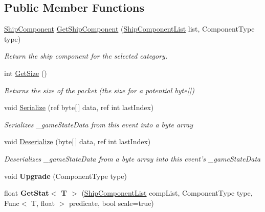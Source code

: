 \subsection*{Public Member Functions}
\begin{DoxyCompactItemize}
\item 
\hyperlink{class_skyrates_1_1_ship_1_1_ship_component}{Ship\-Component} \hyperlink{class_skyrates_1_1_ship_1_1_ship_data_a3ae55a2215158477e44bd7cb2a103e00}{Get\-Ship\-Component} (\hyperlink{class_skyrates_1_1_ship_1_1_ship_component_list}{Ship\-Component\-List} list, Component\-Type type)
\begin{DoxyCompactList}\small\item\em Return the ship component for the selected category. \end{DoxyCompactList}\item 
int \hyperlink{class_skyrates_1_1_ship_1_1_ship_data_ab97c57ac7d3485ed73997201194fed67}{Get\-Size} ()
\begin{DoxyCompactList}\small\item\em Returns the size of the packet (the size for a potential byte\mbox{[}\mbox{]}) \end{DoxyCompactList}\item 
void \hyperlink{class_skyrates_1_1_ship_1_1_ship_data_aecbf0716f2aa099de5398ad12a284560}{Serialize} (ref byte\mbox{[}$\,$\mbox{]} data, ref int last\-Index)
\begin{DoxyCompactList}\small\item\em Serializes \-\_\-game\-State\-Data from this event into a byte array \end{DoxyCompactList}\item 
void \hyperlink{class_skyrates_1_1_ship_1_1_ship_data_a5cdd978d0ede1a2d54c963e43ffd0eab}{Deserialize} (byte\mbox{[}$\,$\mbox{]} data, ref int last\-Index)
\begin{DoxyCompactList}\small\item\em Deserializes \-\_\-game\-State\-Data from a byte array into this event's \-\_\-game\-State\-Data \end{DoxyCompactList}\item 
\hypertarget{class_skyrates_1_1_ship_1_1_ship_data_a26d15f9c540e3b209766f09b82216b9a}{void {\bfseries Upgrade} (Component\-Type type)}\label{class_skyrates_1_1_ship_1_1_ship_data_a26d15f9c540e3b209766f09b82216b9a}

\item 
\hypertarget{class_skyrates_1_1_ship_1_1_ship_data_a2e7b78a5c46e333b91eba050fb9777c2}{float {\bfseries Get\-Stat$<$ T $>$} (\hyperlink{class_skyrates_1_1_ship_1_1_ship_component_list}{Ship\-Component\-List} comp\-List, Component\-Type type, Func$<$ T, float $>$ predicate, bool scale=true)}\label{class_skyrates_1_1_ship_1_1_ship_data_a2e7b78a5c46e333b91eba050fb9777c2}

\end{DoxyCompactItemize}

